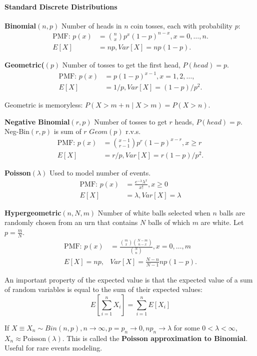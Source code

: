 \documentclass[10pt,twocolumn]{article}
\numberwithin{equation}{section}
\begin{document}
\paragraph{Standard Discrete Distributions}
\ben
\item \textbf{Binomial$(n,p)$} Number of heads in $n$ coin tosses, each with probability $p$: 
\begin{align*}
\text{PMF: } p(x) &= \binom{n}{x} p^x (1-p)^{n-x}, x = 0, \ldots, n. \\
E[X] & = np, Var[X] = np(1-p). 
\end{align*}
\item \textbf{Geometric($(p)$} Number of tosses to get the first head, $P(head) = p$. 
\begin{align*}
\text{PMF: } p(x) &= p(1-p)^{x-1}, x = 1, 2, \ldots, \\
E[X] & = 1/p, Var[X] = (1-p)/p^2. 
\end{align*}
\item Geometric is memoryless: $P(X > m +n \mid X>m ) = P(X>n)$. 
\item \textbf{Negative Binomial$(r,p)$} Number of tosses to get $r$ heads, $P(head) = p$. 
Neg-Bin$(r,p)$ is sum of $r$ $Geom(p)$ r.v.s.
\begin{align*}
\text{PMF: } p(x) &= \binom{x-1}{r-1} p^r(1-p)^{x-r}, x \ge r\\
E[X] & = r/p, Var[X] = r(1-p)/p^2. 
\end{align*}
\item \textbf{Poisson$(\lambda)$} Used to model number of events. 
\begin{align*}
\text{PMF: } p(x) &= \frac{e^{-\lambda}\lambda^x}{x!}, x \ge 0\\
E[X] & = \lambda, Var[X] = \lambda
\end{align*}
\item \textbf{Hypergeometric$(n,N,m)$} Number of white balls selected when $n$ balls are randomly chosen from an urn that contains $N$ balls of which $m$ are white. Let $p = \frac{m}{N}$.
\begin{align*}
\text{PMF: } p(x) &= \frac{\binom{m}{x}\binom{N-m}{n-x}}{\binom{N}{n}}, x = 0, \ldots, m\\
E[X] = np, & Var[X] = \frac{N-n}{N-1}np(1-p).
\end{align*}
\item An important property of the expected value is that the expected value of a sum of random variables is equal to the sum of their expected values:
\[
E\left[ \sum_{i=1}^{n} X_i\right] = \sum_{i=1}^{n} E[X_i] 
\]
\item If $X \equiv X_n \sim Bin(n, p), n \to \infty, p = p_n \to 0, np_n \to \lambda$ for some $0 < \lambda < \infty$, $X_n \approx \text{Poisson}(\lambda)$. This is called the \textbf{Poisson approximation to Binomial}. Useful for rare events modeling. 
\een
\end{document}
